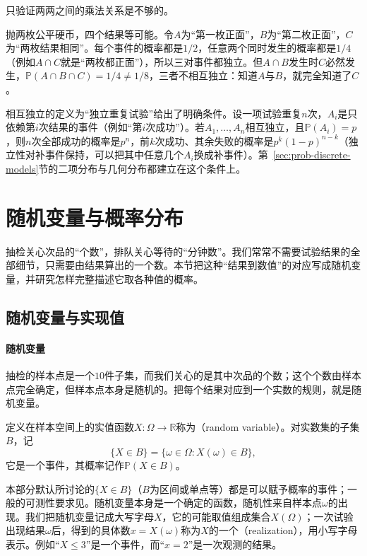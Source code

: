 只验证两两之间的乘法关系是不够的。

\begin{example}[两两独立但不相互独立]
\label{ex:prob-pairwise-not-mutual}
抛两枚公平硬币，四个结果等可能。令$A$为“第一枚正面”，$B$为“第二枚正面”，$C$为“两枚结果相同”。每个事件的概率都是$1/2$，任意两个同时发生的概率都是$1/4$（例如$A\cap C$就是“两枚都正面”），所以三对事件都独立。但$A\cap B$发生时$C$必然发生，$\mathbb{P}(A\cap B\cap C)=1/4\neq1/8$，三者不相互独立：知道$A$与$B$，就完全知道了$C$。
\end{example}

相互独立的定义为“独立重复试验”给出了明确条件。设一项试验重复$n$次，$A_i$是只依赖第$i$次结果的事件（例如“第$i$次成功”）。若$A_1,\dots,A_n$相互独立，且$\mathbb{P}(A_i)=p$，则$n$次全部成功的概率是$p^n$，前$k$次成功、其余失败的概率是$p^k(1-p)^{n-k}$（独立性对补事件保持，可以把其中任意几个$A_i$换成补事件）。第~\ref{sec:prob-discrete-models}节的二项分布与几何分布都建立在这个条件上。

\section{随机变量与概率分布}
\label{sec:prob-distributions}

抽检关心次品的“个数”，排队关心等待的“分钟数”。我们常常不需要试验结果的全部细节，只需要由结果算出的一个数。本节把这种“结果到数值”的对应写成随机变量，并研究怎样完整描述它取各种值的概率。

\subsection{随机变量与实现值}
\label{sec:prob-random-variables}

\paragraph{随机变量}
抽检的样本点是一个$10$件子集，而我们关心的是其中次品的个数；这个个数由样本点完全确定，但样本点本身是随机的。把每个结果对应到一个实数的规则，就是随机变量。

\begin{definition}[随机变量]
\label{def:prob-random-variable}
定义在样本空间上的实值函数$X:\Omega\to\mathbb{R}$称为（random variable）。对实数集的子集$B$，记
\[
  \{X\in B\}=\{\omega\in\Omega: X(\omega)\in B\},
\]
它是一个事件，其概率记作$\mathbb{P}(X\in B)$。
\end{definition}

本部分默认所讨论的$\{X\in B\}$（$B$为区间或单点等）都是可以赋予概率的事件；一般的可测性要求见。随机变量本身是一个确定的函数，随机性来自样本点$\omega$的出现。我们把随机变量记成大写字母$X$，它的可能取值组成集合$X(\Omega)$；一次试验出现结果$\omega$后，得到的具体数$x=X(\omega)$称为$X$的一个（realization），用小写字母表示。例如“$X\leq3$”是一个事件，而“$x=2$”是一次观测的结果。


